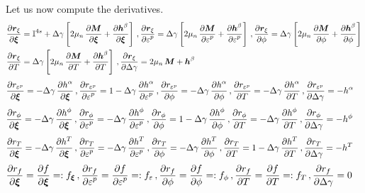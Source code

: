 Let us now compute the derivatives.
\[
  \Bal
  \Partial{\Br_\xi}{\Bxi} &= \SfI^{4s} +
     \Delta\gamma\left[2\mu_n\,\Partial{\BM}{\Bxi} + \Partial{\Bh^\beta}{\Bxi}\right] \,,
  \Partial{\Br_\xi}{\Ve^p} = 
     \Delta\gamma\left[2\mu_n\,\Partial{\BM}{\Ve^p} + \Partial{\Bh^\beta}{\Ve^p}\right] \,,
  \Partial{\Br_\xi}{\phi} = 
     \Delta\gamma\left[2\mu_n\,\Partial{\BM}{\phi} + \Partial{\Bh^\beta}{\phi}\right] \\
  \Partial{\Br_\xi}{T} &= 
     \Delta\gamma\left[2\mu_n\,\Partial{\BM}{T} + \Partial{\Bh^\beta}{T}\right] \,,
  \Partial{\Br_\xi}{\Delta\gamma} = 2\mu_n\,\BM + \Bh^{\beta}
  \Eal
\]
\[
  \Bal
  \Partial{r_{\Ve^p}}{\Bxi} &=  -\Delta\gamma\,\Partial{h^\alpha}{\Bxi} \,,
  \Partial{r_{\Ve^p}}{\Ve^p} = 1 -\Delta\gamma\,\Partial{h^\alpha}{\Ve^p} \,,
  \Partial{r_{\Ve^p}}{\phi} = -\Delta\gamma\,\Partial{h^\alpha}{\phi} \,, 
  \Partial{r_{\Ve^p}}{T} = -\Delta\gamma\,\Partial{h^\alpha}{T} \,,
  \Partial{r_{\Ve^p}}{\Delta\gamma} = -h^\alpha
  \Eal
\]
\[
  \Bal
  \Partial{r_{\phi}}{\Bxi} &=  -\Delta\gamma\,\Partial{h^\phi}{\Bxi} \,,
  \Partial{r_{\phi}}{\Ve^p} = -\Delta\gamma\,\Partial{h^\phi}{\Ve^p} \,,
  \Partial{r_{\phi}}{\phi} = 1 -\Delta\gamma\,\Partial{h^\phi}{\phi} \,, 
  \Partial{r_{\phi}}{T} = -\Delta\gamma\,\Partial{h^\phi}{T} \,,
  \Partial{r_{\phi}}{\Delta\gamma} = -h^\phi
  \Eal
\]
\[
  \Bal
  \Partial{r_{T}}{\Bxi} &=  -\Delta\gamma\,\Partial{h^T}{\Bxi} \,,
  \Partial{r_{T}}{\Ve^p} = -\Delta\gamma\,\Partial{h^T}{\Ve^p} \,,
  \Partial{r_{T}}{\phi} = -\Delta\gamma\,\Partial{h^T}{\phi} \,, 
  \Partial{r_{T}}{T} = 1 -\Delta\gamma\,\Partial{h^T}{T} \,,
  \Partial{r_{T}}{\Delta\gamma} = -h^T
  \Eal
\]
\[
  \Bal
  \Partial{r_{f}}{\Bxi} &=  \Partial{f}{\Bxi} =: f_{\Bxi} \,,
  \Partial{r_{f}}{\Ve^p} = \Partial{f}{\Ve^p} =: f_{\Ve} \,,
  \Partial{r_{f}}{\phi} = \Partial{f}{\phi} =: f_{\phi} \,, 
  \Partial{r_{f}}{T} = \Partial{f}{T} =: f_{T} \,,
  \Partial{r_{f}}{\Delta\gamma} = 0
  \Eal
\]

